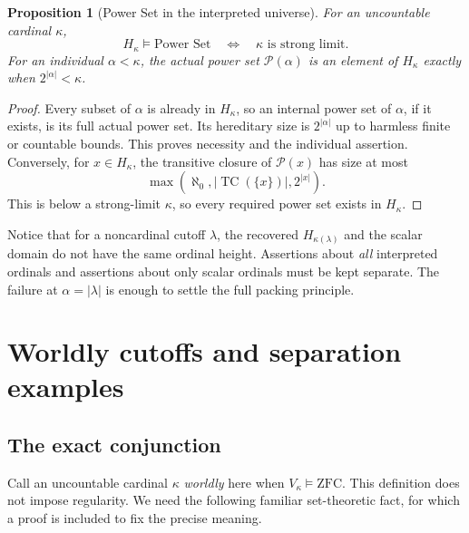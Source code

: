 \documentclass[11pt,letterpaper]{article}
\newtheorem{proposition}[theorem]{Proposition}
\theoremstyle{definition}
\theoremstyle{remark}
\newcommand{\TC}{\operatorname{TC}}
\newcommand{\Pow}{\mathcal P}
\newcommand{\card}[1]{\lvert#1\rvert}
\begin{document}
\begin{proposition}[Power Set in the interpreted universe]
\label{prop:powerset}
For an uncountable cardinal $\kappa$,
\[
 H_\kappa\models\text{Power Set}
 \quad\Longleftrightarrow\quad
 \kappa\text{ is strong limit}.
\]
For an individual $\alpha<\kappa$, the actual power set $\Pow(\alpha)$ is
an element of $H_\kappa$ exactly when $2^{\card\alpha}<\kappa$.
\end{proposition}
\begin{proof}
Every subset of $\alpha$ is already in $H_\kappa$, so an internal power set
of $\alpha$, if it exists, is its full actual power set. Its hereditary
size is $2^{\card\alpha}$ up to harmless finite or countable bounds.
This proves necessity and the individual assertion. Conversely, for
$x\in H_\kappa$, the transitive closure of $\Pow(x)$ has size at most
\[
 \max(\aleph_0,\card{\TC(\{x\})},2^{\card x}).
\]
This is below a strong-limit $\kappa$, so every required power set exists
in $H_\kappa$.
\end{proof}

Notice that for a noncardinal cutoff $\lambda$, the recovered
$H_{\kappa(\lambda)}$ and the scalar domain do not have the same ordinal
height. Assertions about \emph{all} interpreted ordinals and assertions
about only scalar ordinals must be kept separate. The failure at
$\alpha=\card\lambda$ is enough to settle the full packing principle.

\section{Worldly cutoffs and separation examples}
\label{sec:worldly}

\subsection{The exact conjunction}

Call an uncountable cardinal $\kappa$ \emph{worldly} here when
$V_\kappa\models\mathrm{ZFC}$. This definition does not impose regularity.
We need the following familiar set-theoretic fact, for which a proof is
included to fix the precise meaning.
\end{document}
